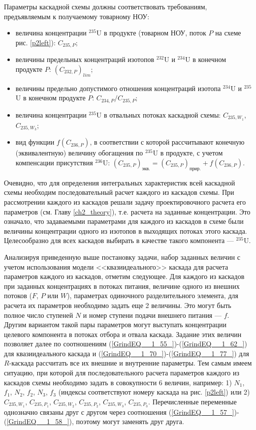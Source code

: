 Параметры каскадной схемы должны соответствовать требованиям, предъявляемым к получаемому товарному НОУ:

\begin{itemize}
    \item величина концентрации $^{235}$U в продукте (товарном НОУ, поток $P$ на схеме рис. \ref{p2left}): $C_{235,{P}}$;
    \item величины предельных концентраций изотопов $^{232}$U и $^{234}$U в конечном продукте $P$: $(C_{232,{P}})_{lim}$;
    \item величины предельно допустимого отношения концентраций изотопа $^{234}$U и $^{235}$U в конечном продукте $P$: ${C_{234,{P}}}/{C_{235,{P}}}$;
    \item величина концентрации $^{235}$U в отвальных потоках каскадной схемы: $C_{235,{W_1}}$, $C_{235,{W_3}}$;
    \item вид функции $f(C_{236,P})$, в соответствии с которой рассчитывают конечную (эквивалентную) величину обогащения по $^{235}$U в продукте, с учетом компенсации присутствия $^{236}$U:
    $(C_{235,P})_\textit{экв.}=(C_{235,P})_\textit{прир.}+f(C_{236,P})$.    
\end{itemize}

Очевидно, что для определения интегральных характеристик всей каскадной схемы необходим последовательный расчет каждого из каскадов схемы. При рассмотрении каждого из каскадов решали задачу проектировочного расчета его параметров (см. Главу \ref{ch2_theory}), т.е. расчета на заданные концентрации. Это означало, что задаваемыми параметрами для каждого из каскадов в схеме были величины концентрации одного из изотопов в выходящих потоках этого каскада. Целесообразно для всех каскадов выбирать в качестве такого компонента --- $^{235}$U.

Анализируя приведенную выше постановку задачи, набор заданных величин с учетом использования модели <<квазиидеального>> каскада для расчета параметров каждого из каскадов, отметим следующее. Для каждого из каскадов при заданных концентрациях в потоках питания, величине одного из внешних потоков ($F$, $P$ или $W$), параметрах одиночного разделительного элемента, для расчета их параметров необходимо задать еще 2 величины. Это могут быть полное число ступеней $N$ и номер ступени подачи внешнего питания --- $f$. Другим вариантом такой пары параметров могут выступать концентрации целевого компонента в потоках отбора и отвала каскада. Задание этих величин позволяет далее по соотношениям (\ref{GrindEQ__1_55_})-(\ref{GrindEQ__1_62_}) для квазиидеального каскада и (\ref{GrindEQ__1_70_})-(\ref{GrindEQ__1_77_}) для $R$-каскада рассчитать все их внешние и внутренние параметры. Тем самым имеем ситуацию, при которой для последовательного расчета параметров каждого из каскадов схемы необходимо задать в совокупности 6 величин, например: 1) $N_1$, $f_1$, $N_2$, $f_2$, $N_3$, $f_3$ (индексы соответствуют номеру каскада на рис. \ref{p2left}) или 2) $C_{235,{W_1}}$, $C_{235,{P_1}}$, $C_{235,{W_2}}$, $C_{235,{P_2}}$, $C_{235,{W_3}}$, $C_{235,{P_3}}$. Перечисленные переменные однозначно связаны друг с другом через соотношения (\ref{GrindEQ__1_57_})-(\ref{GrindEQ__1_58_}), поэтому могут заменять друг друга. 

